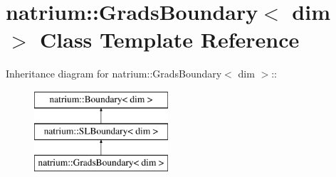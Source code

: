 \hypertarget{classnatrium_1_1GradsBoundary}{
\section{natrium::GradsBoundary$<$ dim $>$ Class Template Reference}
\label{classnatrium_1_1GradsBoundary}
}
Inheritance diagram for natrium::GradsBoundary$<$ dim $>$::\begin{figure}[H]
\begin{center}
\leavevmode
\includegraphics[height=3cm]{classnatrium_1_1GradsBoundary}
\end{center}
\end{figure}
